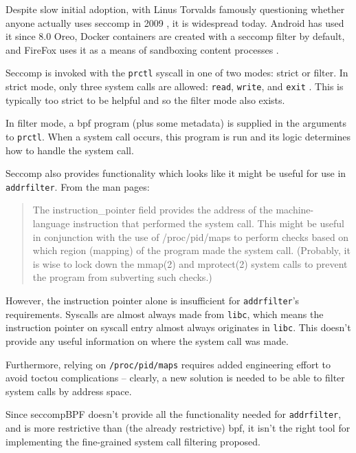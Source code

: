 Despite slow initial adoption, with Linus Torvalds famously questioning whether
anyone actually uses seccomp in 2009 \cite{TORVALDS_ANYONE_USES_SECCOMP}, it is
widespread today. Android has used it since 8.0 Oreo, Docker containers are
created with a seccomp filter by default, and FireFox uses it as a means of
sandboxing content processes \cite{android_seccomp_oreo, docker_seccomp,
firefox_seccomp}.

Seccomp is invoked with the \texttt{prctl} syscall in one of two modes: strict
or filter. In strict mode, only three system calls are allowed: \texttt{read},
\texttt{write}, and \texttt{exit} \cite{MAN_PAGES_SECCOMP}. This is typically
too strict to be helpful and so the filter mode also exists.

In filter mode, a \ac{bpf} program (plus some metadata) is supplied in the arguments to
\texttt{prctl}. When a system call occurs, this program is run and its logic
determines how to handle the system call. 

Seccomp also provides functionality which looks like it might be useful for use in
\texttt{addrfilter}. From the man pages:

\begin{quote}
    The instruction\_pointer field provides the address of the machine-
    language instruction that performed the system call.  This might
    be useful in conjunction with the use of /proc/pid/maps to perform
    checks based on which region (mapping) of the program made the
    system call.  (Probably, it is wise to lock down the mmap(2) and
    mprotect(2) system calls to prevent the program from subverting
    such checks.)
\end{quote}

However, the instruction pointer alone is insufficient for \texttt{addrfilter}'s
requirements. 
Syscalls are almost always made from \texttt{libc}, which means the instruction
pointer on syscall entry almost always originates in \texttt{libc}. This doesn't
provide any useful information on where the system call was made. 

Furthermore, relying on \texttt{/proc/pid/maps} requires added engineering
effort to avoid \ac{toctou} complications -- clearly, a new solution is needed
to be able to filter system calls by address space. 

Since seccompBPF doesn't provide all the functionality needed for 
\texttt{addrfilter}, and is more restrictive than (the already restrictive) 
\ac{bpf}, it isn't the right tool for implementing the fine-grained system
call filtering proposed.

